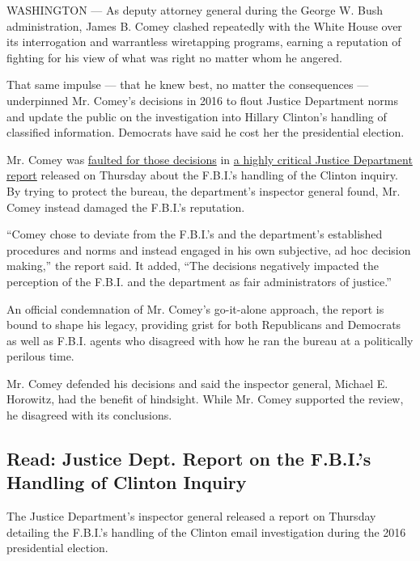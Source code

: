 WASHINGTON --- As deputy attorney general during the George W. Bush
administration, James B. Comey clashed repeatedly with the White House
over its interrogation and warrantless wiretapping programs, earning a
reputation of fighting for his view of what was right no matter whom he
angered.

That same impulse --- that he knew best, no matter the consequences ---
underpinned Mr. Comey's decisions in 2016 to flout Justice Department
norms and update the public on the investigation into Hillary Clinton's
handling of classified information. Democrats have said he cost her the
presidential election.

Mr. Comey was
\href{https://www.nytimes.com/2018/06/14/us/politics/fbi-inspector-general-comey-trump-clinton-report.html}{faulted
for those decisions} in
\href{https://int.nyt.com/data/documenthelper/39-justice-department-report-fbi-clinton-comey/5e54a6bfd23e7b94fbad/optimized/full.pdf\#page=1}{a
highly critical Justice Department report} released on Thursday about
the F.B.I.'s handling of the Clinton inquiry. By trying to protect the
bureau, the department's inspector general found, Mr. Comey instead
damaged the F.B.I.'s reputation.

``Comey chose to deviate from the F.B.I.'s and the department's
established procedures and norms and instead engaged in his own
subjective, ad hoc decision making,'' the report said. It added, ``The
decisions negatively impacted the perception of the F.B.I. and the
department as fair administrators of justice.''

An official condemnation of Mr. Comey's go-it-alone approach, the report
is bound to shape his legacy, providing grist for both Republicans and
Democrats as well as F.B.I. agents who disagreed with how he ran the
bureau at a politically perilous time.

Mr. Comey defended his decisions and said the inspector general, Michael
E. Horowitz, had the benefit of hindsight. While Mr. Comey supported the
review, he disagreed with its conclusions.

\hypertarget{read-justice-dept-report-on-the-fbis-handling-of-clinton-inquiry}{%
\subsection{Read: Justice Dept. Report on the F.B.I.'s Handling of
Clinton
Inquiry}\label{read-justice-dept-report-on-the-fbis-handling-of-clinton-inquiry}}

The Justice Department's inspector general released a report on Thursday
detailing the F.B.I.'s handling of the Clinton email investigation
during the 2016 presidential election.

